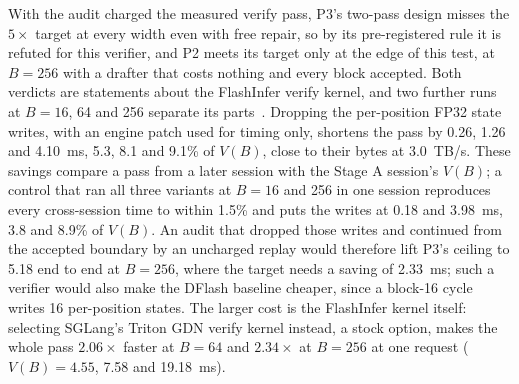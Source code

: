 With the audit charged the measured verify pass, P3's two-pass design misses the $5\times$ target at every width even with free repair, so by its pre-registered rule it is refuted for this verifier, and P2 meets its target only at the edge of this test, at $B=256$ with a drafter that costs nothing and every block accepted. Both verdicts are statements about the FlashInfer verify kernel, and two further runs at $B=16$, 64 and 256 separate its parts~. Dropping the per-position FP32 state writes, with an engine patch used for timing only, shortens the pass by 0.26, 1.26 and 4.10~ms, 5.3, 8.1 and 9.1\% of $V(B)$, close to their bytes at 3.0~TB/s. These savings compare a pass from a later session with the Stage A session's $V(B)$; a control that ran all three variants at $B=16$ and 256 in one session reproduces every cross-session time to within 1.5\% and puts the writes at 0.18 and 3.98~ms, 3.8 and 8.9\% of $V(B)$. An audit that dropped those writes and continued from the accepted boundary by an uncharged replay would therefore lift P3's ceiling to 5.18 end to end at $B=256$, where the target needs a saving of 2.33~ms; such a verifier would also make the DFlash baseline cheaper, since a block-16 cycle writes 16 per-position states. The larger cost is the FlashInfer kernel itself: selecting SGLang's Triton GDN verify kernel instead, a stock option, makes the whole pass $2.06\times$ faster at $B=64$ and $2.34\times$ at $B=256$ at one request ($V(B)=4.55$, 7.58 and 19.18~ms).

